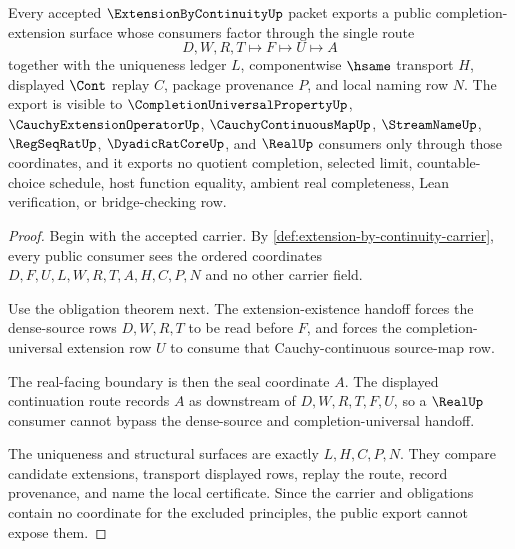 \begin{theorem}
\label{thm:extension-by-continuity-public-export}
Every accepted $\ExtensionByContinuityUp$ packet exports a public completion-extension surface whose consumers factor through the single route
$$
D,W,R,T\longmapsto F\longmapsto U\longmapsto A
$$
together with the uniqueness ledger $L$, componentwise $\hsame$ transport $H$, displayed $\Cont$ replay $C$, package provenance $P$, and local naming row $N$. The export is visible to $\CompletionUniversalPropertyUp$, $\CauchyExtensionOperatorUp$, $\CauchyContinuousMapUp$, $\StreamNameUp$, $\RegSeqRatUp$, $\DyadicRatCoreUp$, and $\RealUp$ consumers only through those coordinates, and it exports no quotient completion, selected limit, countable-choice schedule, host function equality, ambient real completeness, Lean verification, or bridge-checking row.
\end{theorem}
\begin{proof}
Begin with the accepted carrier. By \autoref{def:extension-by-continuity-carrier}, every public consumer sees the ordered coordinates $D,F,U,L,W,R,T,A,H,C,P,N$ and no other carrier field.

Use the obligation theorem next. The extension-existence handoff forces the dense-source rows $D,W,R,T$ to be read before $F$, and forces the completion-universal extension row $U$ to consume that Cauchy-continuous source-map row.

The real-facing boundary is then the seal coordinate $A$. The displayed continuation route records $A$ as downstream of $D,W,R,T,F,U$, so a $\RealUp$ consumer cannot bypass the dense-source and completion-universal handoff.

The uniqueness and structural surfaces are exactly $L,H,C,P,N$. They compare candidate extensions, transport displayed rows, replay the route, record provenance, and name the local certificate. Since the carrier and obligations contain no coordinate for the excluded principles, the public export cannot expose them.
\end{proof}


